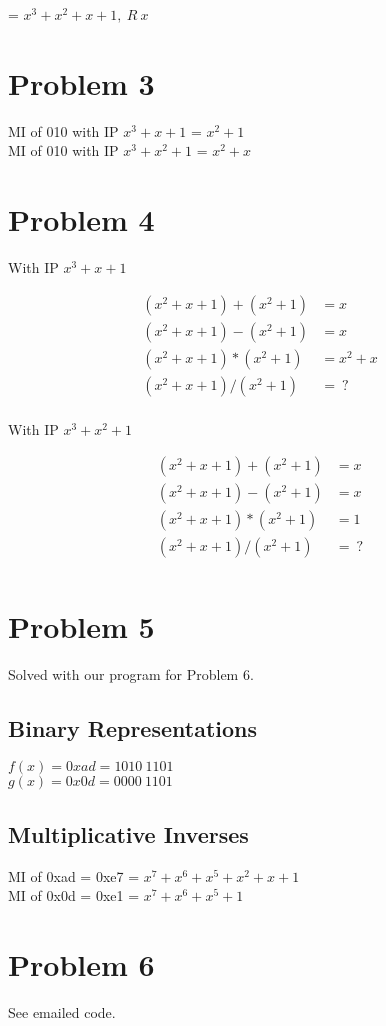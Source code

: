 \documentclass[letterpaper]{article}
\begin{document}
= \(x^3 + x^2 + x + 1,\ R\ x\)

\section{Problem 3}

MI of 010 with IP \(x^3 + x + 1\) = \(x^2 + 1\)
\\
MI of 010 with IP \(x^3 + x^2 + 1\) = \(x^2 + x\)

\section{Problem 4}

With IP \(x^3 + x + 1\)

\begin{equation*}
  \begin{split}
    (x^2 + x + 1) + (x^2 + 1) &= x \\
    (x^2 + x + 1) - (x^2 + 1) &= x \\
    (x^2 + x + 1) * (x^2 + 1) &= x^2 + x \\
    (x^2 + x + 1) / (x^2 + 1) &=\ ? \\
  \end{split}
\end{equation*}

With IP \(x^3 + x^2 + 1\)

\begin{equation*}
  \begin{split}
    (x^2 + x + 1) + (x^2 + 1) &= x \\
    (x^2 + x + 1) - (x^2 + 1) &= x \\
    (x^2 + x + 1) * (x^2 + 1) &= 1 \\
    (x^2 + x + 1) / (x^2 + 1) &=\ ? \\
  \end{split}
\end{equation*}

\section{Problem 5}

Solved with our program for Problem 6.

\subsection{Binary Representations}

\(f(x) = 0xad = 1010\ 1101\) \\
\(g(x) = 0x0d = 0000\ 1101\) \\

\subsection{Multiplicative Inverses}

MI of 0xad = 0xe7 = \(x^7 + x^6 + x^5 + x^2 + x + 1\)
\\
MI of 0x0d = 0xe1 = \(x^7 + x^6 + x^5 + 1\)

\section{Problem 6}

See emailed code.
\end{document}

